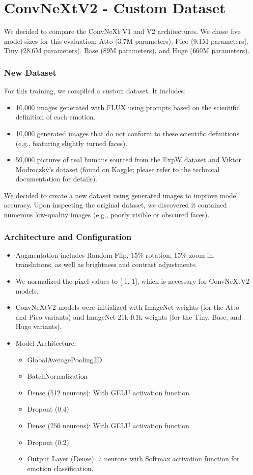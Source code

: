\documentclass{article}
\begin{document}
\section{ConvNeXtV2 - Custom Dataset}
We decided to compare the ConvNeXt V1 and V2 architectures. We chose five model sizes for this evaluation: Atto (3.7M parameters), Pico (9.1M parameters), Tiny (28.6M parameters), Base (89M parameters), and Huge (660M parameters).

\subsubsection{New Dataset} 
For this training, we compiled a custom dataset. It includes:
\begin{itemize}
    \item 10,000 images generated with FLUX using prompts based on the scientific definition of each emotion.
    \item 10,000 generated images that do not conform to these scientific definitions (e.g., featuring slightly turned faces). 
    \item 59,000 pictures of real humans sourced from the ExpW dataset and Viktor Modroczký's dataset (found on Kaggle; please refer to the technical documentation for details).
\end{itemize} 

We decided to create a new dataset using generated images to improve model accuracy. Upon inspecting the original dataset, we discovered it contained numerous low-quality images (e.g., poorly visible or obscured faces).

\subsubsection{Architecture and Configuration}
\begin{itemize}
    \item Augmentation includes Random Flip, 15\% rotation, 15\% zoom-in, translations, as well as brightness and contrast adjustments.
    \item We normalized the pixel values to [-1, 1], which is necessary for ConvNeXtV2 models.
    \item ConvNeXtV2 models were initialized with ImageNet weights (for the Atto and Pico variants) and ImageNet-21k-ft1k weights (for the Tiny, Base, and Huge variants).
    \item Model Architecture:
    \begin{itemize}
        \item GlobalAveragePooling2D
        \item BatchNormalization
        \item Dense (512 neurons): With GELU activation function.
        \item Dropout (0.4)
        \item Dense (256 neurons): With GELU activation function.
        \item Dropout (0.2)
        \item Output Layer (Dense): 7 neurons with Softmax activation function for emotion classification.
    \end{itemize}
\end{itemize}
\end{document}
